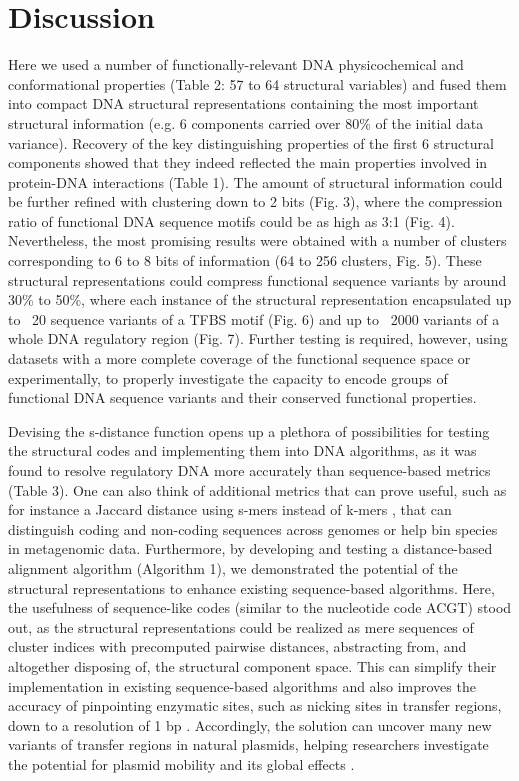 \documentclass[sigconf]{acmart}
\begin{document}
\section{Discussion}
Here we used a number of functionally-relevant DNA physicochemical and conformational properties (Table 2: 57 to 64 structural variables) and fused them into compact DNA structural representations containing the most important structural information (e.g. 6 components carried over 80\% of the initial data variance). Recovery of the key distinguishing properties of the first 6 structural components showed that they indeed reflected the main properties involved in protein-DNA interactions (Table 1). The amount of structural information could be further refined with clustering down to 2 bits (Fig. 3), where the compression ratio of functional DNA sequence motifs could be as high as 3:1 (Fig. 4). Nevertheless, the most promising results were obtained with a number of clusters corresponding to 6 to 8 bits of information (64 to 256 clusters, Fig. 5). These structural representations could compress functional sequence variants by around 30\% to 50\%, where each instance of the structural representation encapsulated up to ~20 sequence variants of a TFBS motif (Fig. 6) and up to ~2000 variants of a whole DNA regulatory region (Fig. 7). Further testing is required, however, using datasets with a more complete coverage of the functional sequence space or experimentally, to properly investigate the capacity to encode groups of functional DNA sequence variants and their conserved functional properties. 

Devising the s-distance function opens up a plethora of possibilities for testing the structural codes and implementing them into DNA algorithms, as it was found to resolve regulatory DNA more accurately than sequence-based metrics \cite{Zrimec2020-wx,Zrimec2018-lx} (Table 3). One can also think of additional metrics that can prove useful, such as for instance a Jaccard distance using s-mers instead of k-mers \cite{Zrimec2020-wx}, that can distinguish coding and non-coding sequences across genomes or help bin species in metagenomic data. Furthermore, by developing and testing a distance-based alignment algorithm (Algorithm 1), we demonstrated the potential of the structural representations to enhance existing sequence-based algorithms. Here, the usefulness of sequence-like codes (similar to the nucleotide code ACGT) stood out, as the structural representations could be realized as mere sequences of cluster indices with precomputed pairwise distances, abstracting from, and altogether disposing of, the structural component space. This can simplify their implementation in existing sequence-based algorithms and also improves the accuracy of pinpointing enzymatic sites, such as nicking sites in transfer regions, down to a resolution of 1 bp \cite{Zrimec2020-wx}. Accordingly, the solution can uncover many new variants of transfer regions in natural plasmids, helping researchers investigate the potential for plasmid mobility and its global effects \cite{Zrimec2020-wx}.
\end{document}
